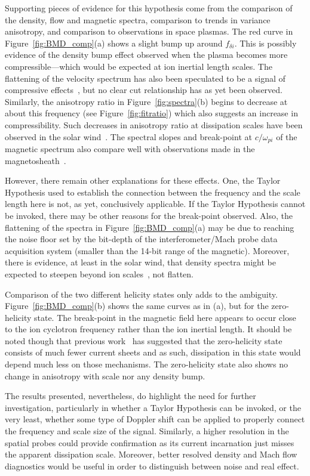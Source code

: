 \documentclass[preprint2]{aastex}
\begin{document}
Supporting pieces of evidence for this hypothesis come from the comparison of the density, flow and magnetic spectra, comparison to trends in variance anisotropy, and comparison to observations in space plasmas. The red curve in Figure~\ref{fig:BMD_comp}(a) shows a slight bump up around $f_{\delta i}$. This is possibly evidence of the density bump effect observed when the plasma becomes more compressible---which would be expected at ion inertial length scales. The flattening of the velocity spectrum has also been speculated to be a signal of compressive effects~\citep{rob10}, but no clear cut relationship has as yet been observed. Similarly, the anisotropy ratio in Figure~\ref{fig:spectra}(b) begins to decrease at about this frequency (see Figure~\ref{fig:fitratio}) which also suggests an increase in compressibility. Such decreases in anisotropy ratio at dissipation scales have been observed in the solar wind~\citep{ham08,kiy13}. The spectral slopes and break-point at $c/\omega_{pi}$ of the magnetic spectrum also compare well with observations made in the magnetosheath~\citep{yor08}.

However, there remain other explanations for these effects. One, the Taylor Hypothesis used to establish the connection between the frequency and the scale length here is not, as yet, conclusively applicable. If the Taylor Hypothesis cannot be invoked, there may be other reasons for the break-point observed. Also, the flattening of the spectra in Figure~\ref{fig:BMD_comp}(a) may be due to reaching the noise floor set by the bit-depth of the interferometer/Mach probe data acquisition system (smaller than the 14-bit range of the magnetic). Moreover, there is evidence, at least in the solar wind, that density spectra might be expected to steepen beyond ion scales~\citep{che12}, not flatten.

Comparison of the two different helicity states only adds to the ambiguity. Figure~\ref{fig:BMD_comp}(b) shows the same curves as in (a), but for the zero-helicity state. The break-point in the magnetic field here appears to occur close to the ion cyclotron frequency rather than the ion inertial length. It should be noted though that previous work~\citep{sch14b} has suggested that the zero-helicity state consists of much fewer current sheets and as such, dissipation in this state would depend much less on those mechanisms. The zero-helicity state also shows no change in anisotropy with scale nor any density bump.

The results presented, nevertheless, do highlight the need for further investigation, particularly in whether a Taylor Hypothesis can be invoked, or the very least, whether some type of Doppler shift can be applied to properly connect the frequency and scale size of the signal. Similarly, a higher resolution in the spatial probes could provide confirmation as its current incarnation just misses the apparent dissipation scale. Moreover, better resolved density and Mach flow diagnostics would be useful in order to distinguish between noise and real effect.
\end{document}

